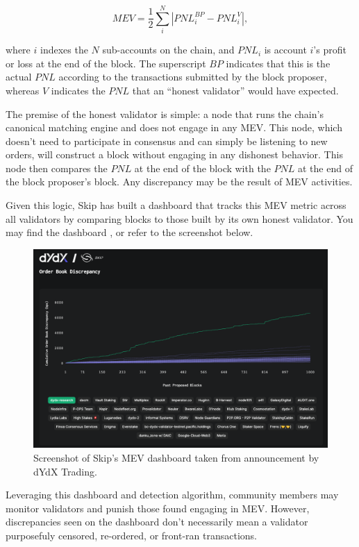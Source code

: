             \begin{equation}
                MEV = \frac{1}{2}\sum_{i}^{N}{|PNL_i^{BP} - PNL_i^{V}|},
            \end{equation}

            where $i$ indexes the $N$ sub-accounts on the chain, and $PNL_i$ is account $i$'s profit or loss at the end of the block. The superscript $BP$ indicates that this is the actual $PNL$ according to the transactions submitted by the block proposer, whereas $V$ indicates the $PNL$ that an ``honest validator'' would have expected.

            The premise of the honest validator is simple: a node that runs the chain's canonical matching engine and does not engage in any MEV. This node, which doesn't need to participate in consensus and can simply be listening to new orders, will construct a block without engaging in any dishonest behavior. This node then compares the $PNL$ at the end of the block with the $PNL$ at the end of the block proposer's block. Any discrepancy may be the result of MEV activities. 

            Given this logic, Skip has built a dashboard that tracks this MEV metric across all validators by comparing blocks to those built by its own honest validator. You may find the dashboard , or refer to the screenshot below.

            \begin{figure}[htp]
                \centering
                \includegraphics[width=0.7\linewidth]{figs/mev.png}
                \caption{Screenshot of Skip's MEV dashboard taken from  announcement by dYdX Trading.}
                \label{fig:mev}
            \end{figure}

            Leveraging this dashboard and detection algorithm, community members may monitor validators and punish those found engaging in MEV. However, discrepancies seen on the dashboard don't necessarily mean a validator purposefuly censored, re-ordered, or front-ran transactions.

